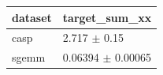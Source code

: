 \begin{tabular}{ll}
\toprule
dataset & target\_sum\_xx \\
\midrule
casp & 2.717 $\pm$ 0.15 \\
sgemm & 0.06394 $\pm$ 0.00065 \\
\bottomrule
\end{tabular}
